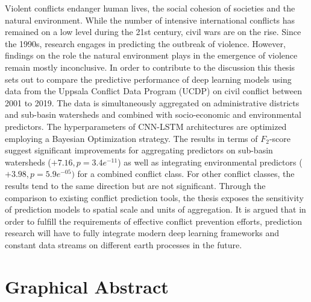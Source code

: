 \documentclass[a4paper,11pt]{article}
\begin{document}
Violent conflicts endanger human lives, the social cohesion of societies
and the natural environment. While the number of intensive international conflicts
has remained on a low level during the 21st century, civil wars are on the rise.
Since the 1990s, research engages in predicting the outbreak of violence. However,
findings on the role the natural environment plays in the emergence of
violence remain mostly inconclusive. In order to contribute to the discussion this
thesis sets out to compare the predictive performance of deep learning models using
data from the Uppsala Conflict Data Program (UCDP) on civil conflict between 2001 to 2019.
The data is simultaneously aggregated on administrative districts and sub-basin watersheds
and combined with socio-economic and environmental predictors. The hyperparameters
of CNN-LSTM architectures are optimized employing a Bayesian Optimization strategy.
The results in terms of \(F_2\)-score suggest significant improvements for aggregating
predictors on sub-basin watersheds (\(+7.16,p=3.4e^{-11}\)) as well as integrating
environmental predictors (\(+3.98,p=5.9e^{-05})\) for a combined conflict class. For
other conflict classes, the results tend to the same direction but are not significant.
Through the comparison to existing conflict prediction tools, the thesis exposes
the sensitivity of prediction models to spatial scale and units of aggregation.
It is argued that in order to fulfill the requirements of effective conflict
prevention efforts, prediction research will have to fully integrate modern deep
learning frameworks and constant data streams on different earth processes in the future.

\newpage

\hypertarget{graphical-abstract}{%
\section*{Graphical Abstract}\label{graphical-abstract}}
\end{document}
